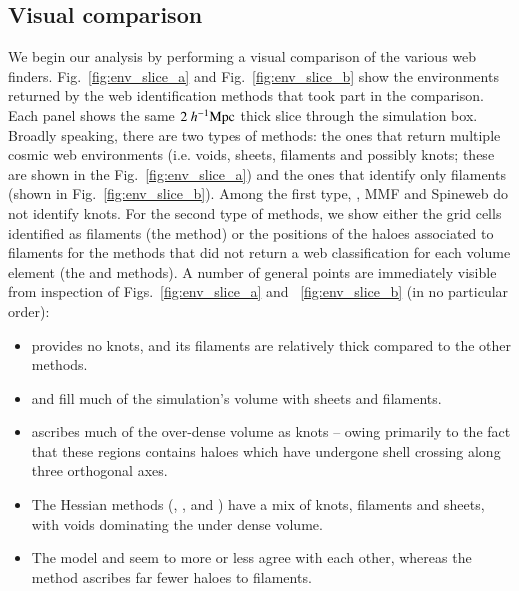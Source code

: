 \subsection{Visual comparison}
\label{sec:cube}
We begin our analysis by performing a visual comparison of the various web finders. Fig.~\ref{fig:env_slice_a} and Fig.~\ref{fig:env_slice_b} show the environments returned by the web identification methods that took part in the comparison. Each panel shows the same $2~h^{-1}\rm Mpc$ thick slice through the simulation box. Broadly speaking, there are two types of methods: the ones that return multiple cosmic web environments (i.e. voids, sheets, filaments and possibly knots; these are shown in the Fig.~\ref{fig:env_slice_a}) and the ones that identify only filaments (shown in Fig.~\ref{fig:env_slice_b}). Among the first type, \disperse{}, MMF and Spineweb do not identify knots. For the second type of methods, we show either the grid cells identified as filaments (the \bisous{} method) or the positions of the haloes associated to filaments for the methods that did not return a web classification for each volume element (the \fine{} and \mst{} methods). A number of general points are immediately visible from inspection of Figs.~\ref{fig:env_slice_a} and ~\ref{fig:env_slice_b} (in no particular order): 
\begin{itemize}
\item \disperse{} provides no knots, and its filaments are relatively thick compared to the other methods.
\item \mmft{} and \spine{} fill much of the simulation's volume with sheets and filaments.
\item \origami{} ascribes much of the over-dense volume as knots -- owing primarily to the fact that these regions contains haloes which have undergone shell crossing along three orthogonal axes.
\item The Hessian methods (\nexus{}, \tweb{}, \vweb{} and \classic{}) have a mix of knots, filaments and sheets, with voids dominating the under dense volume.
\item The \bisous{} model and \mst{} seem to more or less agree with each other, whereas the \fine{} method ascribes far fewer haloes to filaments.
\end{itemize} 

